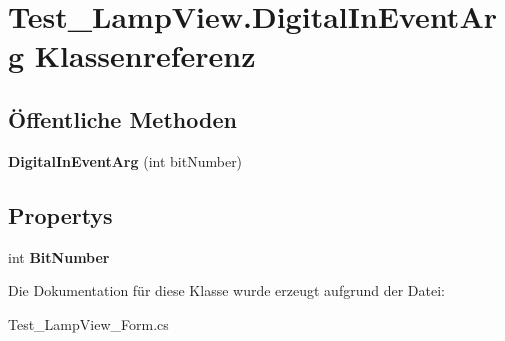 \hypertarget{class_test___lamp_view_1_1_digital_in_event_arg}{
\section{Test\_\-LampView.DigitalInEventArg Klassenreferenz}
\label{class_test___lamp_view_1_1_digital_in_event_arg}
}
\subsection*{Öffentliche Methoden}
\begin{DoxyCompactItemize}
\item 
\hypertarget{class_test___lamp_view_1_1_digital_in_event_arg_aa6c7168600403e69cb571cc76094ecfe}{
{\bfseries DigitalInEventArg} (int bitNumber)}
\label{class_test___lamp_view_1_1_digital_in_event_arg_aa6c7168600403e69cb571cc76094ecfe}

\end{DoxyCompactItemize}
\subsection*{Propertys}
\begin{DoxyCompactItemize}
\item 
\hypertarget{class_test___lamp_view_1_1_digital_in_event_arg_afc917ab4e6171a391729b90baec28168}{
int {\bfseries BitNumber}}
\label{class_test___lamp_view_1_1_digital_in_event_arg_afc917ab4e6171a391729b90baec28168}

\end{DoxyCompactItemize}


Die Dokumentation für diese Klasse wurde erzeugt aufgrund der Datei:\begin{DoxyCompactItemize}
\item 
Test\_\-LampView\_\-Form.cs\end{DoxyCompactItemize}

